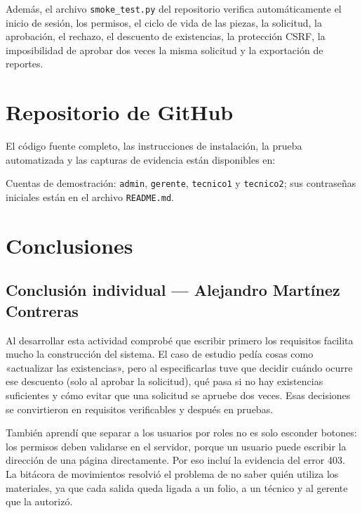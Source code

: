 \documentclass[12pt,letterpaper]{article}
\begin{document}
Además, el archivo \texttt{smoke\_test.py} del repositorio verifica automáticamente el inicio de sesión, los permisos, el ciclo de vida de las piezas, la solicitud, la aprobación, el rechazo, el descuento de existencias, la protección CSRF, la imposibilidad de aprobar dos veces la misma solicitud y la exportación de reportes.

\section{Repositorio de GitHub}

El código fuente completo, las instrucciones de instalación, la prueba automatizada y las capturas de evidencia están disponibles en:

\begin{center}
\end{center}

Cuentas de demostración: \texttt{admin}, \texttt{gerente}, \texttt{tecnico1} y \texttt{tecnico2}; sus contraseñas iniciales están en el archivo \texttt{README.md}.

\section{Conclusiones}

\subsection*{Conclusión individual — Alejandro Martínez Contreras}

Al desarrollar esta actividad comprobé que escribir primero los requisitos facilita mucho la construcción del sistema. El caso de estudio pedía cosas como «actualizar las existencias», pero al especificarlas tuve que decidir cuándo ocurre ese descuento (solo al aprobar la solicitud), qué pasa si no hay existencias suficientes y cómo evitar que una solicitud se apruebe dos veces. Esas decisiones se convirtieron en requisitos verificables y después en pruebas.

También aprendí que separar a los usuarios por roles no es solo esconder botones: los permisos deben validarse en el servidor, porque un usuario puede escribir la dirección de una página directamente. Por eso incluí la evidencia del error 403. La bitácora de movimientos resolvió el problema de no saber quién utiliza los materiales, ya que cada salida queda ligada a un folio, a un técnico y al gerente que la autorizó.
\end{document}
